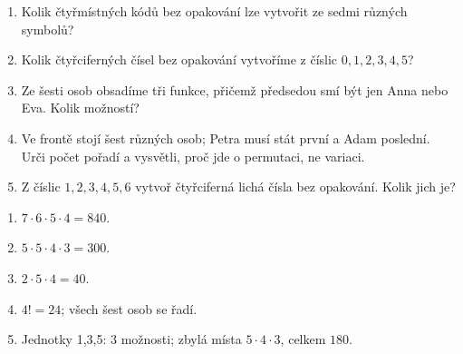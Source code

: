 \documentclass[11pt,a4paper]{article}
\begin{document}
\begin{zadaniReseniBox}[title={Domácí úkol}]

\begin{enumerate}[label=\alph*),leftmargin=*,itemsep=2pt]

\item Kolik čtyřmístných kódů bez opakování lze vytvořit ze sedmi různých symbolů?
\item Kolik čtyřciferných čísel bez opakování vytvoříme z číslic $0,1,2,3,4,5$?
\item Ze šesti osob obsadíme tři funkce, přičemž předsedou smí být jen Anna nebo Eva. Kolik možností?
\item Ve frontě stojí šest různých osob; Petra musí stát první a Adam poslední. Urči počet pořadí a vysvětli, proč jde o permutaci, ne variaci.
\item Z číslic $1,2,3,4,5,6$ vytvoř čtyřciferná lichá čísla bez opakování. Kolik jich je?

\end{enumerate}

\tcblower

\begin{enumerate}[label=\alph*),leftmargin=*,itemsep=2pt]

\item $7\cdot6\cdot5\cdot4=840$.
\item $5\cdot5\cdot4\cdot3=300$.
\item $2\cdot5\cdot4=40$.
\item $4!=24$; všech šest osob se řadí.
\item Jednotky 1,3,5: $3$ možnosti; zbylá místa $5\cdot4\cdot3$, celkem $180$.

\end{enumerate}

\end{zadaniReseniBox}

\end{document}
